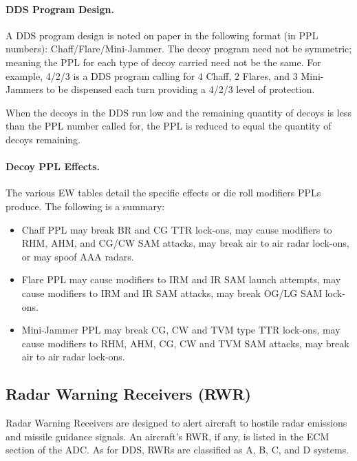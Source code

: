 \paragraph{DDS Program Design.} A DDS program design is noted on paper in the following format (in PPL numbers): Chaff/Flare/Mini-Jammer. The decoy program need not be symmetric; meaning the PPL for each type of decoy carried need not be the same. For example, 4/2/3 is a DDS program calling for 4 Chaff, 2 Flares, and 3 Mini-Jammers to be dispensed each turn providing a 4/2/3 level of protection.

When the decoys in the DDS run low and the remaining quantity of decoys is less than the PPL number called for, the PPL is reduced to equal the quantity of decoys remaining.

\paragraph{Decoy PPL Effects.} The various EW tables detail the specific effects or die roll modifiers PPLs produce. The following is a summary:

\begin{itemize}

    \item Chaff PPL may break BR and CG TTR lock-ons, may cause modifiers to RHM, AHM, and CG/CW SAM attacks, may break air to air radar lock-ons, or may spoof AAA radars.

    \item Flare PPL may cause modifiers to IRM and IR SAM launch attempts, may cause modifiers to IRM and IR SAM attacks, may break OG/LG SAM lock-ons.

    \item Mini-Jammer PPL may break CG, CW and TVM type TTR lock-ons, may cause modifiers to RHM, AHM, CG, CW and TVM SAM attacks, may break air to air radar lock-ons.

\end{itemize}

\subsection{Radar Warning Receivers (RWR)}

Radar Warning Receivers are designed to alert aircraft to hostile radar emissions and missile guidance signals. An aircraft's RWR, if any, is listed in the ECM section of the ADC. As for DDS, RWRs are classified as A, B, C, and D systems.

